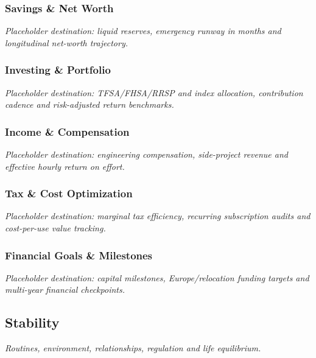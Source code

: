 \documentclass{article}
\begin{document}
\subsubsection{Savings \& Net Worth}\label{sec:savings-and-net-worth}
\textit{Placeholder destination: liquid reserves, emergency runway in months and longitudinal net-worth trajectory.}

\subsubsection{Investing \& Portfolio}\label{sec:investing-and-portfolio}
\textit{Placeholder destination: TFSA/FHSA/RRSP and index allocation, contribution cadence and risk-adjusted return benchmarks.}

\subsubsection{Income \& Compensation}\label{sec:income-and-compensation}
\textit{Placeholder destination: engineering compensation, side-project revenue and effective hourly return on effort.}

\subsubsection{Tax \& Cost Optimization}\label{sec:tax-and-cost-optimization}
\textit{Placeholder destination: marginal tax efficiency, recurring subscription audits and cost-per-use value tracking.}

\subsubsection{Financial Goals \& Milestones}\label{sec:financial-goals-and-milestones}
\textit{Placeholder destination: capital milestones, Europe/relocation funding targets and multi-year financial checkpoints.}

\subsection{Stability}\label{sec:stability}
\textit{Routines, environment, relationships, regulation and life equilibrium.}
\end{document}
